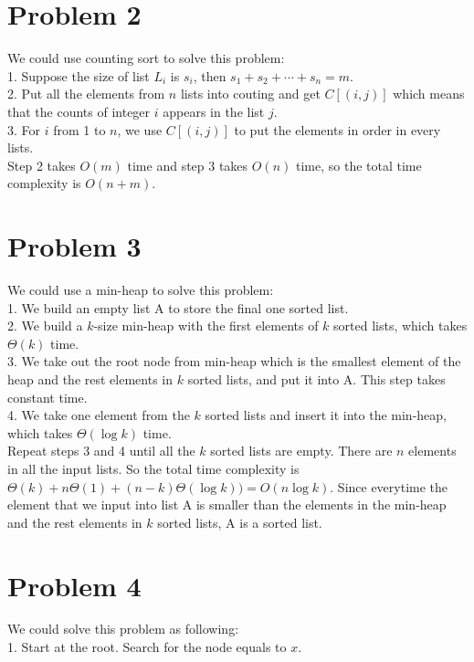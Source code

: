 \documentclass[twoside,11pt]{homework}
\begin{document}
\section*{Problem 2}
We could use counting sort to solve this problem: \\
1. Suppose the size of list $L_i$ is $s_i$, then $s_1 + s_2 + \cdots + s_n = m$. \\
2. Put all the elements from $n$ lists into couting and get $C[(i, j)]$ which means that the counts of integer $i$ appears in the list $j$. \\
3. For $i$ from 1 to $n$, we use $C[(i, j)]$ to put the elements in order in every lists. \\
Step 2 takes $O(m)$ time and step 3 takes $O(n)$ time, so the total time complexity is $O(n+m)$.

\section*{Problem 3}
We could use a min-heap to solve this problem: \\
1. We build an empty list A to store the final one sorted list. \\
2. We build a $k$-size min-heap with the first elements of $k$ sorted lists, which takes $\Theta(k)$ time. \\
3. We take out the root node from min-heap which is the smallest element of the heap and the rest elements in $k$ sorted lists, and put it into A. 
This step takes constant time.\\
4. We take one element from the $k$ sorted lists and insert it into the min-heap, which takes $\Theta(\log k)$ time.\\
Repeat steps 3 and 4 until all the $k$ sorted lists are empty. 
There are $n$ elements in all the input lists. %
So the total time complexity  is $\Theta(k) +n\Theta(1) + (n-k)\Theta(\log k)) = O(n \log k)$.
Since everytime the element that we input into list A is smaller than the elements in the min-heap and the rest elements in $k$ sorted lists, A is a sorted list.

\section*{Problem 4}
We could solve this problem as following: \\
1. Start at the root.
Search for the node equals to $x$.
\end{document}
